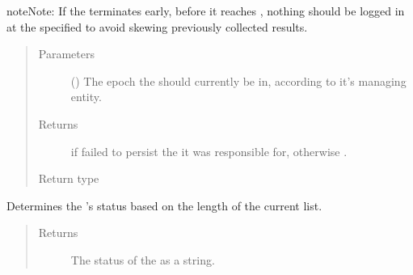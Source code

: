 \documentclass[letterpaper,10pt,english]{sphinxmanual}
\begin{document}
\begin{fulllineitems}
\begin{fulllineitems}
\begin{sphinxadmonition}{note}{Note:}
If the  terminates early, before it reaches
{\hyperref[\detokenize{app.domain:app.domain.master_servers.Master.MAX_EPOCHS}]{}},
nothing should be logged in
{\hyperref[\detokenize{app.domain.helpers:app.domain.helpers.smart_dataclasses.LoggingData}]{}}
at the specified  to avoid skewing previously
collected results.
\end{sphinxadmonition}
\begin{quote}\begin{description}
\item[{Parameters}] \leavevmode
{} () \textendash{} The epoch the  should currently be in, according
to it’s managing {\hyperref[\detokenize{app.domain:app.domain.cluster_groups.Cluster.master}]{}} entity.

\item[{Returns}] \leavevmode
{} if  failed to persist the {\hyperref[\detokenize{app.domain:app.domain.cluster_groups.Cluster.file}]{}} it
was responsible for, otherwise .

\item[{Return type}] \leavevmode
{}

\end{description}\end{quote}

\end{fulllineitems}


\begin{fulllineitems}
\label{\detokenize{app.domain:app.domain.cluster_groups.Cluster.get_cluster_status}}
Determines the ’s status based on the length of the
current {\hyperref[\detokenize{app.domain:app.domain.cluster_groups.Cluster.members}]{}} list.
\begin{quote}\begin{description}
\item[{Returns}] \leavevmode
The status of the  as a string.


\end{description}
\end{quote}
\end{fulllineitems}
\end{fulllineitems}
\end{document}
